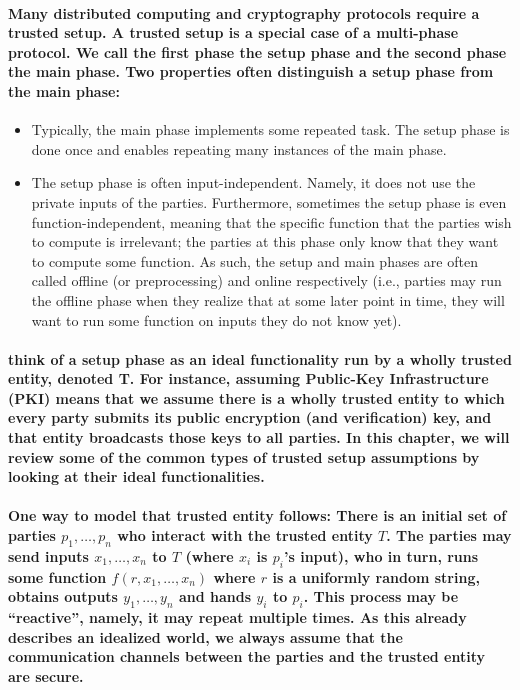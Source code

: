 \paragraph{Many distributed computing and cryptography protocols require
a trusted setup. A trusted setup is a special case of a multi-phase
protocol. We call the first \textbf{phase} the setup phase and the
second phase the main phase. Two properties often distinguish
a setup phase from the \textbf{main phase}:}
\begin{itemize}
\item Typically, the main phase implements some repeated task. The setup
phase is done once and enables repeating many instances of the main
phase.
\item The setup phase is often input-independent. Namely, it does not use
the private inputs of the parties. Furthermore, sometimes the setup
phase is even function-independent, meaning that the specific function
that the parties wish to compute is irrelevant; the parties at this
phase only know that they want to compute some function. As such,
the setup and main phases are often called offline (or preprocessing)
and online respectively (i.e., parties may run the offline phase when
they realize that at some later point in time, they will want to run
some function on inputs they do not know yet).
\end{itemize}

\paragraph{think of a setup phase as an ideal functionality run by a wholly
trusted entity, denoted T. For instance, assuming Public-Key Infrastructure
(PKI) means that we assume there is a wholly trusted entity to
which every party submits its public encryption (and verification) key,
 and that entity broadcasts those keys to all parties. In this
chapter, we will review some of the common types of trusted setup assumptions
by looking at their ideal functionalities.}

\paragraph{One way to model that trusted entity follows: There is an initial
set of parties $p_{1},\dots,p_{n}$ who interact with the trusted
entity $T$. The parties may send inputs $x_{1},\dots,x_{n}$ to $T$
(where $x_{i}$ is $p_{i}$'s input), who in turn, runs some function
$f\left(r,x_{1},\dots,x_{n}\right)$ where $r$ is a uniformly random
string, obtains outputs $y_{1},\dots,y_{n}$ and hands $y_{i}$ to
$p_{i}$. This process may be \textquotedblleft reactive\textquotedblright ,
namely, it may repeat multiple times. As this already describes an
idealized world, we always assume that the communication channels
between the parties and the trusted entity are secure.}

